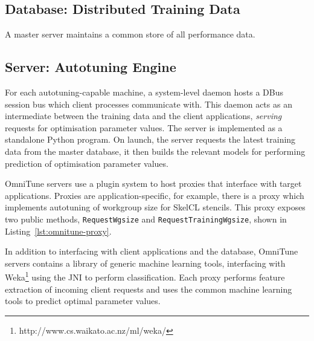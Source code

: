 

\subsection{Database: Distributed Training Data}

A master server maintains a common store of all performance
data. 


\subsection{Server: Autotuning Engine}

For each autotuning-capable machine, a system-level daemon hosts a
DBus session bus which client processes communicate with. This daemon
acts as an intermediate between the training data and the client
applications, \emph{serving} requests for optimisation parameter
values. The server is implemented as a standalone Python program. On
launch, the server requests the latest training data from the master
database, it then builds the relevant models for performing prediction
of optimisation parameter values. 

OmniTune servers use a plugin system to host proxies that interface
with target applications. Proxies are application-specific, for
example, there is a proxy which implements autotuning of workgroup
size for SkelCL stencils. This proxy exposes two public methods,
\texttt{RequestWgsize} and \texttt{RequestTrainingWgsize}, shown in
Listing~\ref{lst:omnitune-proxy}.

In addition to interfacing with client applications and the database,
OmniTune servers contains a library of generic machine learning tools,
interfacing with Weka\footnote{http://www.cs.waikato.ac.nz/ml/weka/}
using the JNI to perform classification. Each proxy performs feature
extraction of incoming client requests and uses the common machine
learning tools to predict optimal parameter values. 




